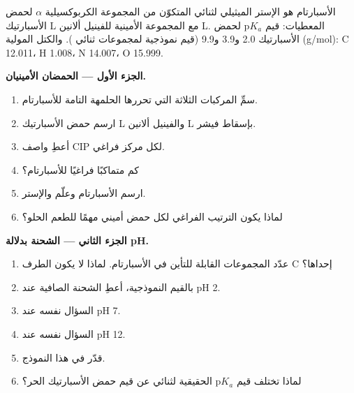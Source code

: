 \begin{problem}
\label{pb:b2:biomolecules:1}
الأسبارتام هو الإستر الميثيلي لثنائي  المتكوّن من المجموعة الكربوكسيلية $\alpha$ لحمض الأسبارتيك L
مع المجموعة الأمينية للفينيل ألانين L. المعطيات: قيم $\mathrm pK_a$ لحمض الأسبارتيك 2.0 و3.9 و9.9 (قيم
نموذجية لمجموعات ثنائي ). والكتل المولية (\unit{g/mol}): C 12.011، H 1.008، N 14.007،
O 15.999.

\medskip
\noindent\textbf{الجزء الأول --- الحمضان الأمينيان.}
\begin{enumerate}
  \item سمِّ المركبات الثلاثة التي تحررها الحلمهة التامة للأسبارتام.
  \item ارسم حمض الأسبارتيك L والفينيل ألانين L بإسقاط فيشر.
  \item أعطِ واصف CIP لكل مركز فراغي.
  \item كم متماكبًا فراغيًا للأسبارتام؟
  \item ارسم الأسبارتام وعلّم  والإستر.
  \item لماذا يكون الترتيب الفراغي لكل حمض أميني مهمًا للطعم الحلو؟
\end{enumerate}

\medskip
\noindent\textbf{الجزء الثاني --- الشحنة بدلالة pH.}
\begin{enumerate}[resume]
  \item عدّد المجموعات القابلة للتأين في الأسبارتام. لماذا لا يكون الطرف C إحداها؟
  \item بالقيم النموذجية، أعطِ الشحنة الصافية عند pH 2.
  \item السؤال نفسه عند pH 7.
  \item السؤال نفسه عند pH 12.
  \item قدّر  في هذا النموذج.
  \item لماذا تختلف قيم $\mathrm pK_a$ الحقيقية لثنائي  عن قيم حمض الأسبارتيك
        الحر؟
\end{enumerate}


\end{problem}
